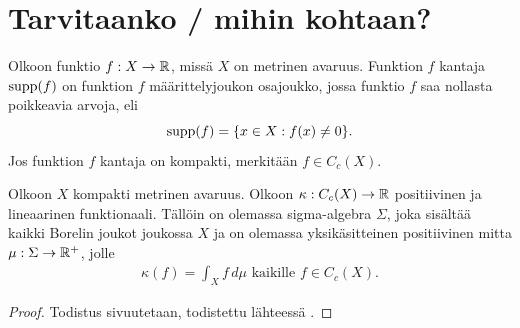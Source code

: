 \documentclass[12pt,oneside,a4paper]{amsbook} %
\begin{document}
\section{Tarvitaanko / mihin kohtaan?}

\begin{definition}
    Olkoon funktio $f:X \to \mathbb{R}$, missä $X$ on metrinen avaruus. Funktion $f$ kantaja $\operatorname{supp}(f)$ on funktion $f$ määrittelyjoukon osajoukko, jossa funktio $f$ saa nollasta poikkeavia arvoja, eli
    \begin{equation*}
        \operatorname{supp}(f) = \{x \in X : f(x) \ne 0\}.
    \end{equation*}
     Jos funktion $f$ kantaja on kompakti, merkitään $f \in C_c(X)$.
\end{definition}



\begin{theorem}\label{thm:Riesz}
    Olkoon $X$ kompakti metrinen avaruus. Olkoon $\kappa:C_c(X) \to \mathbb{R}$ positiivinen ja lineaarinen funktionaali. Tällöin on olemassa sigma-algebra $\Sigma$, joka sisältää kaikki Borelin joukot joukossa $X$ ja on olemassa yksikäsitteinen positiivinen mitta $\mu:\Sigma \to {\mathbb{R}^{+}}$, jolle
    \begin{align*}
        \kappa (f) = \int_X f \, d\mu \text{ kaikille } f \in C_c(X).
    \end{align*}
\end{theorem}
\begin{proof}
    Todistus sivuutetaan, todistettu lähteessä \cite[s. 40]{rudin}.
\end{proof}
\end{document}
